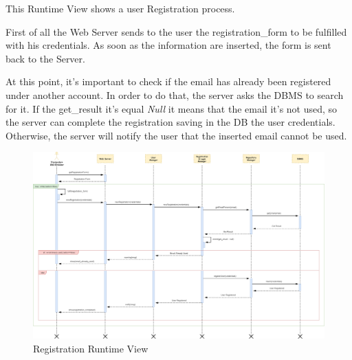 This Runtime View shows a user Registration process.\par
First of all the Web Server sends to the user the registration\_form to be fulfilled with his credentials. As soon as the information are inserted, the form is sent back to the Server.\par
At this point, it’s important to check if the email has already been registered under another account. In order to do that, the server asks the DBMS to search for it. If the get\_result it’s equal \emph{Null} it means that the email it’s not used, so the server can complete the registration saving in the DB the user credentials. Otherwise, the server will notify the user that the inserted email cannot be used.
\begin{figure}[H]
	\centering
	\includegraphics[scale=0.2]{Images/Runtime/Registration}
	\caption{Registration Runtime View}
\end{figure}

